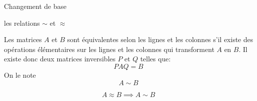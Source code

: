 \begin{parag}{Changement de base}
\begin{truc}
    \end{truc}
    \begin{subparag}{les relations $\sim$ et $\approx$}
    \begin{definition}
        Les matrices $A$ et $B$ sont équivalentes selon les lignes et les colonnes s'il existe des opérations élémentaires sur les lignes et les colonnes qui transforment $A$ en $B$. Il existe donc deux matrices inversibles $P$ et $Q$ telles que:
        \[PAQ = B\]
        On le note
        \[A \sim B\]
    \end{definition}
    \begin{truc}
    \[A \approx B \implies A \sim B\]
    \end{truc}
        
    \end{subparag}
\end{parag}
